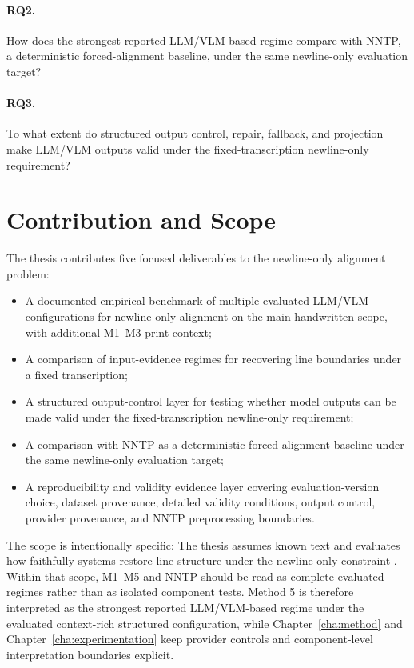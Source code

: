 \paragraph{RQ2.} How does the strongest reported LLM/VLM-based regime compare with NNTP, a deterministic forced-alignment baseline, under the same newline-only evaluation target?

\paragraph{RQ3.} To what extent do structured output control, repair, fallback, and projection make LLM/VLM outputs valid under the fixed-transcription newline-only requirement?

\section{Contribution and Scope}
\label{sec:intro_contribution_scope}

The thesis contributes five focused deliverables to the newline-only alignment problem:
\begin{itemize}
  \item A documented empirical benchmark of multiple evaluated LLM/VLM configurations for newline-only alignment on the main handwritten scope, with additional M1--M3 print context;
  \item A comparison of input-evidence regimes for recovering line boundaries under a fixed transcription;
  \item A structured output-control layer for testing whether model outputs can be made valid under the fixed-transcription newline-only requirement;
  \item A comparison with NNTP as a deterministic forced-alignment baseline under the same newline-only evaluation target;
  \item A reproducibility and validity evidence layer covering evaluation-version choice, dataset provenance, detailed validity conditions, output control, provider provenance, and NNTP preprocessing boundaries.
\end{itemize}

The scope is intentionally specific: The thesis assumes known text and evaluates how faithfully systems restore line structure under the newline-only constraint . Within that scope, M1--M5 and NNTP should be read as complete evaluated regimes rather than as isolated component tests. Method 5 is therefore interpreted as the strongest reported LLM/VLM-based regime under the evaluated context-rich structured configuration, while Chapter~\ref{cha:method} and Chapter~\ref{cha:experimentation} keep provider controls and component-level interpretation boundaries explicit.

